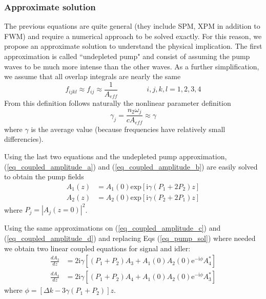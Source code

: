 \documentclass[12pt,a4paper,twoside]{article}
\begin{document}
\subsubsection{Approximate solution}
The previous equations are quite general (they include SPM, XPM in addition to FWM) and require a numerical approach to be solved exactly.
For this reason, we propose an approximate solution to understand the physical implication.
The first approximation is called ``undepleted pump" and consist of assuming the pump waves to be much more intense than the other waves.
As a further simplification, we assume that all overlap integrals are nearly the same
\begin{equation}
	f_{ijkl} \approx f_{ij} \approx \frac{1}{A_{eff}}	\qquad \qquad i,j,k,l = 1,2,3,4
	\label{eq_overlap_approx}
\end{equation}
From this definition follows naturally the nonlinear parameter definition
\begin{equation}
	\gamma_j = \frac{n_2\omega_j}{cA_{eff}} \approx \gamma
	\label{eq_gamma_approx}
\end{equation}
where $\gamma$ is the average value (because frequencies have relatively small differencies).

Using the last two equations and the undepleted pump approximation, (\ref{eq_coupled_amplitude_a}) and (\ref{eq_coupled_amplitude_b}) are easily solved to obtain the pump fields
\begin{subequations}
\begin{align}
	A_1(z) &= A_1(0)\mathrm{exp}[\mathrm{i}\gamma(P_1 + 2P_2)z] \\
	A_2(z) &= A_2(0)\mathrm{exp}[\mathrm{i}\gamma(P_2 + 2P_1)z]
\end{align}
	\label{eq_pump_sol}
\end{subequations}
where $P_j = |A_j(z=0)|^2$.

Using the same approximations on (\ref{eq_coupled_amplitude_c}) and (\ref{eq_coupled_amplitude_d}) and replacing Eqs (\ref{eq_pump_sol}) where needed we obtain two linear coupled equations for signal and idler:
\begin{subequations}
\begin{align}
	\frac{dA_3}{dz} &= 2\mathrm{i}\gamma [(P_1 + P_2)A_3 + A_1(0)A_2(0)\mathrm{e}^{-\mathrm{i}\phi}A_4^*]
	\label{eq_sig}\\
	\frac{dA_4}{dz} &= 2\mathrm{i}\gamma [(P_1 + P_2)A_4 + A_1(0)A_2(0)\mathrm{e}^{-\mathrm{i}\phi}A_3^*]
	\label{eq_idl}
\end{align}
\end{subequations}
where $\phi = [\Delta k - 3\gamma(P_1 + P_2)]z$.
\end{document}
